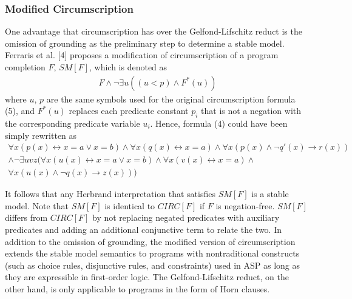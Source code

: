 \subsubsection{Modified Circumscription}
One advantage that circumscription has over the Gelfond-Lifschitz reduct 
is the omission of grounding as the preliminary step to determine a stable 
model. Ferraris et al. [4] proposes a modification of circumscription of 
a program completion $F$, $SM[F]$, which is denoted as 
\begin{align}
    F \land \neg \exists u((u < p) \land F^*(u)) 
\end{align}
where $u$, $p$ are the same symbols used for the original circumscription formula (5), 
and $F^*(u)$ 
replaces each predicate constant $p_i$ that is not a negation with 
the corresponding predicate variable $u_i$. Hence, formula (4) could 
have been simply rewritten as 
\begin{multline*}
    \forall x (p(x) \leftrightarrow x = a \lor x = b) \land 
    \forall x (q(x) \leftrightarrow x = a) \land 
    \forall x (p(x) \land \neg q'(x) \rightarrow r(x)) \\ 
    \land \neg \exists uvz (
        \forall x (u(x) \leftrightarrow x = a \lor x = b) \land 
        \forall x (v(x) \leftrightarrow x = a) \land 
        \\ \forall x (u(x) \land \neg q(x) \rightarrow z(x)) 
    ) 
\end{multline*}

It follows 
that any Herbrand interpretation that satisfies $SM[F]$ is a stable model. 
Note that $SM[F]$ is identical to $CIRC[F]$ if $F$ is negation-free. 
$SM[F]$ differs from $CIRC[F]$ by not replacing  
negated predicates with auxiliary predicates and adding an additional 
conjunctive term to relate the two. In addition to the omission of 
grounding, the modified version of circumscription 
extends the stable model semantics to programs with nontraditional constructs 
(such as choice rules, disjunctive rules, and constraints) used in ASP as 
long as they are expressible in first-order logic. The Gelfond-Lifschitz reduct, 
on the other hand, is only applicable to programs in the form of Horn clauses.

